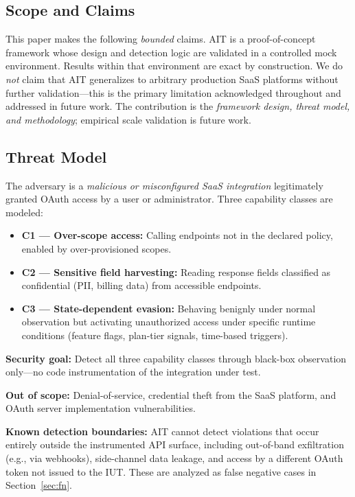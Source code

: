 \documentclass[conference]{IEEEtran}
\begin{document}
\subsection{Scope and Claims}
\label{sec:scope}

This paper makes the following \emph{bounded} claims. AIT is a
proof-of-concept framework whose design and detection logic are
validated in a controlled mock environment. Results within that
environment are exact by construction. We do \emph{not} claim that
AIT generalizes to arbitrary production SaaS platforms without further
validation---this is the primary limitation acknowledged throughout
and addressed in future work. The contribution is the \emph{framework
design, threat model, and methodology}; empirical scale validation is
future work.

\subsection{Threat Model}
\label{sec:threat}

The adversary is a \emph{malicious or misconfigured SaaS integration}
legitimately granted OAuth access by a user or administrator. Three
capability classes are modeled:

\begin{itemize}
  \item \textbf{C1 --- Over-scope access:} Calling endpoints not in the
        declared policy, enabled by over-provisioned scopes.
  \item \textbf{C2 --- Sensitive field harvesting:} Reading response
        fields classified as confidential (PII, billing data) from
        accessible endpoints.
  \item \textbf{C3 --- State-dependent evasion:} Behaving benignly
        under normal observation but activating unauthorized access
        under specific runtime conditions (feature flags, plan-tier
        signals, time-based triggers).
\end{itemize}

\noindent\textbf{Security goal:} Detect all three capability classes
through black-box observation only---no code instrumentation of the
integration under test.

\noindent\textbf{Out of scope:} Denial-of-service, credential theft
from the SaaS platform, and OAuth server implementation vulnerabilities.

\noindent\textbf{Known detection boundaries:} AIT cannot detect
violations that occur entirely outside the instrumented API surface,
including out-of-band exfiltration (e.g., via webhooks), side-channel
data leakage, and access by a different OAuth token not issued to the
IUT. These are analyzed as false negative cases in
Section~\ref{sec:fn}.
\end{document}
